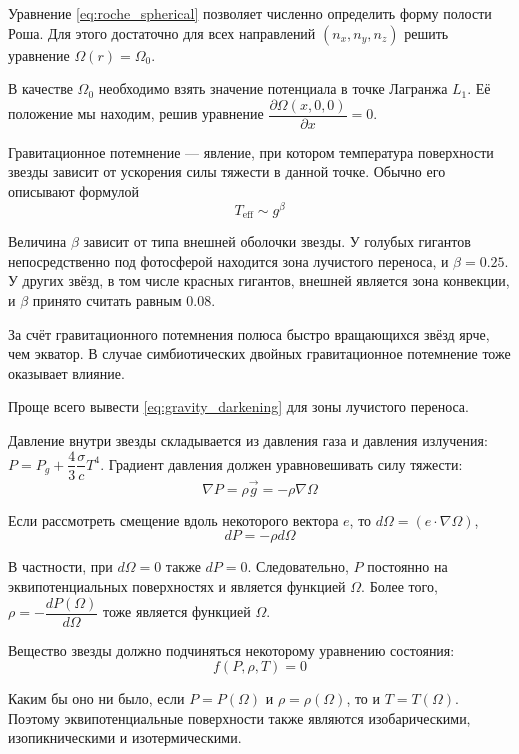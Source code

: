 Уравнение \eqref{eq:roche_spherical} позволяет численно определить форму полости Роша. Для этого достаточно для всех направлений $(n_x, n_y, n_z)$ решить уравнение $\Omega(r) = \Omega_0.$

В качестве $\Omega_0$ необходимо взять значение потенциала в точке Лагранжа $L_1$. Её положение мы находим, решив уравнение $\dfrac{\partial \Omega(x, 0, 0)}{\partial x} = 0$.



Гравитационное потемнение --- явление, при котором температура поверхности звезды зависит от ускорения силы тяжести в данной точке. Обычно его описывают формулой
\begin{equation}
T_\text{eff} \sim g^\beta
\label{eq:gravity_darkening}
\end{equation}

Величина $\beta$ зависит от типа внешней оболочки звезды. У голубых гигантов непосредственно под фотосферой находится зона лучистого переноса, и $\beta = 0.25$. У других звёзд, в том числе красных гигантов, внешней является зона конвекции, и $\beta$ принято считать равным $0.08$.

За счёт гравитационного потемнения полюса быстро вращающихся звёзд ярче, чем экватор. В случае симбиотических двойных гравитационное потемнение тоже оказывает влияние.



Проще всего вывести \eqref{eq:gravity_darkening} для зоны лучистого переноса.

Давление внутри звезды складывается из давления газа и давления излучения: $P = P_g + \dfrac{4}{3} \dfrac{\sigma}{c} T^4$.
Градиент давления должен уравновешивать силу тяжести:
\[
\nabla P = \rho \vec g = -\rho \nabla \Omega
\]

Если рассмотреть смещение вдоль некоторого вектора $e$, то $d\Omega = (e \cdot \nabla \Omega)$,
\[
dP = -\rho d\Omega
\]

В частности, при $d\Omega = 0$ также $dP = 0$. Следовательно, $P$ постоянно на эквипотенциальных поверхностях и является функцией $\Omega$. Более того, $\rho = -\dfrac{dP(\Omega)}{d\Omega}$ тоже является функцией $\Omega$.

Вещество звезды должно подчиняться некоторому уравнению состояния:
\[
f(P, \rho, T) = 0
\]

Каким бы оно ни было, если $P = P(\Omega)$ и $\rho = \rho(\Omega)$, то и $T = T(\Omega)$. Поэтому эквипотенциальные поверхности также являются изобарическими, изопикническими и изотермическими.

